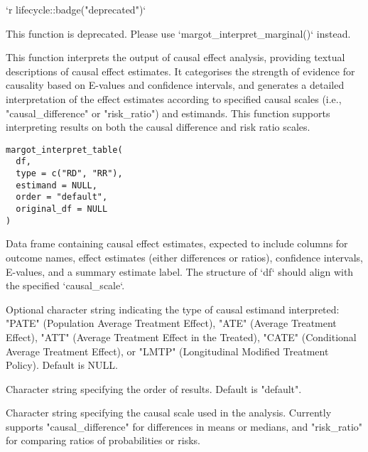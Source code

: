 \documentclass[a4paper]{book}
\begin{document}
%
\begin{Description}
`r lifecycle::badge("deprecated")`

This function is deprecated. Please use `margot\_interpret\_marginal()` instead.

This function interprets the output of causal effect analysis, providing textual descriptions
of causal effect estimates. It categorises the strength of evidence for causality based on
E-values and confidence intervals, and generates a detailed interpretation of the effect
estimates according to specified causal scales (i.e., "causal\_difference" or "risk\_ratio")
and estimands. This function supports interpreting results on both the causal difference
and risk ratio scales.
\end{Description}
%
\begin{Usage}
\begin{verbatim}
margot_interpret_table(
  df,
  type = c("RD", "RR"),
  estimand = NULL,
  order = "default",
  original_df = NULL
)
\end{verbatim}
\end{Usage}
%
\begin{Arguments}
\begin{ldescription}
\item[\code{df}] Data frame containing causal effect estimates, expected to include columns for
outcome names, effect estimates (either differences or ratios), confidence intervals,
E-values, and a summary estimate label. The structure of `df` should align with the specified
`causal\_scale`.

\item[\code{estimand}] Optional character string indicating the type of causal estimand interpreted: "PATE"
(Population Average Treatment Effect), "ATE" (Average Treatment Effect), "ATT" (Average
Treatment Effect in the Treated), "CATE" (Conditional Average Treatment Effect), or "LMTP"
(Longitudinal Modified Treatment Policy). Default is NULL.

\item[\code{order}] Character string specifying the order of results. Default is "default".

\item[\code{causal\_scale}] Character string specifying the causal scale used in the analysis.
Currently supports "causal\_difference" for differences in means or medians, and "risk\_ratio"
for comparing ratios of probabilities or risks.
\end{ldescription}
\end{Arguments}
\end{document}
